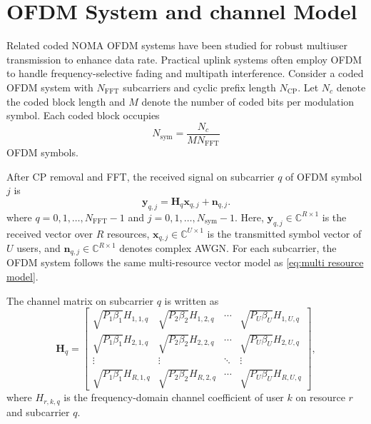 \section{OFDM System and channel Model}
Related coded NOMA OFDM systems have been studied for robust multiuser transmission to enhance data rate\cite{li2013advanced, saraereh2019efficient, lin2024slotted}.
Practical uplink systems often employ OFDM to handle frequency-selective fading and multipath interference. 
Consider a coded OFDM system with $N_{\mathrm{FFT}}$ subcarriers and cyclic prefix length $N_{\mathrm{CP}}$. Let $N_c$ denote the coded block length and $M$ denote the number of coded bits per modulation symbol. Each coded block occupies
\begin{equation}
    N_{\mathrm{sym}}
    =
    \frac{N_c}{MN_{\mathrm{FFT}}}
\end{equation}
OFDM symbols.

After CP removal and FFT, the received signal on subcarrier $q$ of OFDM symbol $j$ is
\begin{equation}
    \bm{y}_{q,j}
    =
    \bm{H}_{q}\bm{x}_{q,j}+\bm{n}_{q,j}.
    \label{eq:ofdm-subcarrier-model}
\end{equation}
where $q=0,1,\ldots,N_{\mathrm{FFT}}-1$ and $j=0,1,\ldots,N_{\mathrm{sym}}-1$. Here, $\bm{y}_{q,j}\in\mathbb{C}^{R\times 1}$ is the received vector over $R$ resources, $\bm{x}_{q,j}\in\mathbb{C}^{U\times 1}$ is the transmitted symbol vector of $U$ users, and $\bm{n}_{q,j}\in\mathbb{C}^{R\times 1}$ denotes complex AWGN. For each subcarrier, the OFDM system follows the same multi-resource vector model as \eqref{eq:multi resource model}.

The channel matrix on subcarrier $q$ is written as
\begin{equation}
    \bm{H}_{q}
    =
    \begin{bmatrix}
    \sqrt{P_1\beta_1}H_{1,1,q} & \sqrt{P_2\beta_2}H_{1,2,q} & \cdots & \sqrt{P_U\beta_U}H_{1,U,q}\\
    \sqrt{P_1\beta_1}H_{2,1,q} & \sqrt{P_2\beta_2}H_{2,2,q} & \cdots & \sqrt{P_U\beta_U}H_{2,U,q}\\
    \vdots & \vdots & \ddots & \vdots\\
    \sqrt{P_1\beta_1}H_{R,1,q} & \sqrt{P_2\beta_2}H_{R,2,q} & \cdots & \sqrt{P_U\beta_U}H_{R,U,q}
    \end{bmatrix},
    \label{eq:ofdm-channel-matrix}
\end{equation}
where $H_{r,k,q}$ is the frequency-domain channel coefficient of user $k$ on resource $r$ and subcarrier $q$.

